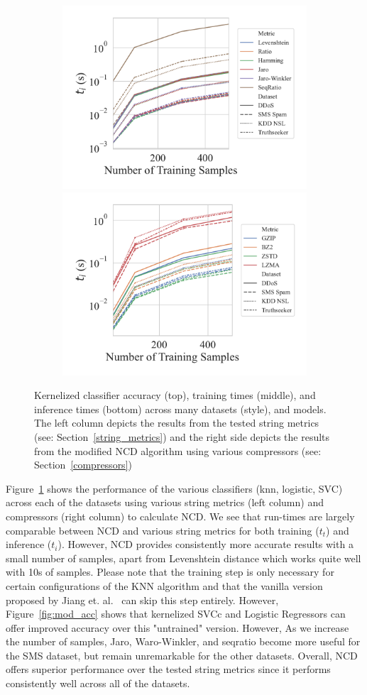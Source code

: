 \documentclass[conference]{IEEEtran}
\begin{document}
\begin{figure}[htb]
    \begin{subfigure}[htb]{\textwidth}
        \includegraphics[width=.45\textwidth]{figs/combined/string_metric_vs_predict_time.pdf}
        \includegraphics[width=.45\textwidth]{figs/combined/compressor_metric_vs_predict_time.pdf}
    \end{subfigure}
    
    \caption{Kernelized classifier accuracy (top), training times (middle), and inference times (bottom) across many datasets (style), and models. The left column depicts the results from the tested string metrics (see: Section~\ref{string_metrics}) and the right side depicts the results from the modified NCD algorithm using various compressors (see: Section~\ref{compressors})}
    \label{fig:models_summary}
\end{figure}

Figure~\ref{fig:models_summary} shows the performance of the various classifiers (knn, logistic, SVC) across each of the datasets using various string metrics (left column) and compressors (right column) to calculate NCD. We see that run-times are largely comparable between NCD and various string metrics for both training ($t_t$) and inference ($t_i$). 
However, NCD provides consistently more accurate results with a small number of samples, apart from Levenshtein distance which works quite well with 10s of samples. 
Please note that the training step is only necessary for certain configurations of the KNN algorithm and that the vanilla version proposed by Jiang et. al.~\cite{jiang2022less} can skip this step entirely. However, Figure~\ref{fig:mod_acc} shows that kernelized SVCc and Logistic Regressors can offer improved accuracy over this "untrained" version.
However, As we increase the number of samples, Jaro, Waro-Winkler, and seqratio become more useful for the SMS dataset, but remain unremarkable for the other datasets. Overall, NCD offers superior performance over the tested string metrics since it performs consistently well across all of the datasets. 
\end{document}
